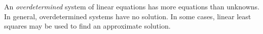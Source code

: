 \documentclass[12pt]{article}
\begin{document}
An \emph{overdetermined} system of linear equations has more equations than unknowns.  In general, overdetermined systems have no solution.  In some cases, linear least squares may be used to find an approximate solution.
\end{document}
